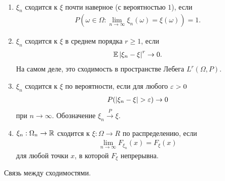 \documentclass[../main.tex]{subfiles}
\begin{document}
\begin{df}\
 \begin{enumerate}
  \item $ \xi_n $ сходится к $ \xi $ почти наверное (с вероятностью $ 1 $), если
   \begin{align*}
    P \left( \omega \in \Omega : \lim_{n \to \infty} \xi_n(\omega) = \xi(\omega) \right) = 1.
   \end{align*} 
  \item $ \xi_n $ сходится к $ \xi $ в среднем порядка $ r \geq 1 $, если
   \begin{align*}
    \mathbb E \left| \xi_n - \xi \right|^{r} \to 0.
   \end{align*} На самом деле, это сходимость в пространстве Лебега $ L^{r}(\Omega,P) $.
  \item $ \xi_n $ сходится к $ \xi $ по вероятности, если для любого $ \varepsilon > 0 $
   \begin{align*}
    P(\left| \xi_n - \xi \right| > \varepsilon) \to 0
   \end{align*} при $ n \to \infty $. Обозначение $ \xi_n \xrightarrow{P} \xi $.
  \item $ \xi_n : \Omega_n \to \mathbb{R}$ сходится к $ \xi : \Omega \to R$ по распределению, если
   \begin{align*}
    \lim_{n \to \infty} F_{\xi_n}(x) = F_\xi(x)
   \end{align*} для любой точки $ x $, в которой $ F_\xi $ непрерывна.
 \end{enumerate}
\end{df}

Связь между сходимостями.
\end{document}
